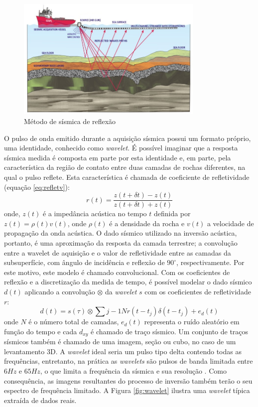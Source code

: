 \begin{figure}[ht!]
\begin{center}
  \includegraphics[width=0.8\textwidth]{fig/seismic_survey_2}
  \caption{Método de sísmica de reflexão \citep{figsismica}}
  \label{fig:1sismica}
\end{center}
\end{figure}

O pulso de onda emitido durante a aquisição sísmica possui um formato próprio, uma identidade, 
conhecido como \textit{wavelet}. É possível imaginar que a resposta sísmica medida
é composta em parte por esta identidade e, em parte, pela característica da região de contato
entre duas camadas de rochas diferentes, na qual o pulso reflete.
Esta característica é chamada de coeficiente de refletividade (equação \ref{eq:refletv}):
\begin{equation}
r(t) = \frac{z(t+\delta t)-z(t)}{z(t+\delta t)+z(t)}
\label{eq:refletv}
\end{equation}
onde, $z(t)$ é a impedância acústica no tempo $t$ definida por
$z(t)=\rho(t)v(t)$, onde $\rho(t)$ é a densidade da rocha e $v(t)$ a
velocidade de propagação da onda acústica.
O dado sísmico utilizado na inversão acústica, portanto,
é uma aproximação da resposta da camada terrestre;
a convolução entre a wavelet de aquisição e o valor de refletividade entre as
camadas da subsuperfície, com ângulo de incidência e reflexão de $90^\circ$,
respectivamente. Por este motivo, este modelo é chamado convolucional.
Com os coeficientes de reflexão e a discretização da medida de tempo, é possível
modelar o dado sísmico $d(t)$ aplicando a convolução $\otimes$
da \textit{wavelet} $s$ com os coeficientes de refletividade $r$:
\begin{equation}
d(t) = s(\tau) \otimes \sum{j-1}{N} r(t- t_j) \delta(t - t_j) + e_d(t)
\end{equation}
onde $N$ é o número total de camadas, $e_d(t)$ representa o ruído aleatório em função do tempo
e cada $d_{xy}$ é chamado de traço sísmico. Um conjunto de traços
sísmicos também é chamado de uma imagem, seção ou cubo, no caso de um
levantamento 3D. A \textit{wavelet} ideal seria um pulso tipo delta contendo
todas as frequências, entretanto, na prática as
\textit{wavelets} são pulsos de banda limitada entre $6Hz$ e $65Hz$, o que
limita a frequência da sísmica e sua resolução \citep[p. 11]{sen_livro}.
Como consequência, as imagens resultantes do processo de inversão também terão
o seu espectro de frequência limitado.
A Figura \ref{fig:wavelet} ilustra uma \textit{wavelet} típica extraída de dados
reais.

